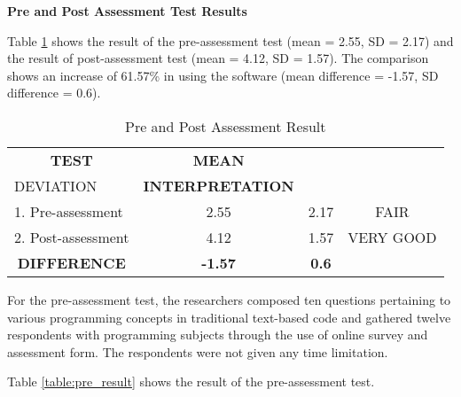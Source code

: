 \flushleft
\textbf{Pre and Post Assessment Test Results}
\justifying

\parx
Table \ref{table:pre_post} shows the result of the pre-assessment test
(mean = 2.55, SD = 2.17) and the result of post-assessment test
(mean = 4.12, SD = 1.57). The comparison shows an increase of 61.57\% in using
the software (mean difference = -1.57, SD difference = 0.6).

\begin{longtable}[c]{lccc}
\caption{Pre and Post Assessment Result}
\label{table:pre_post}\\ \hline
\multicolumn{1}{c}{\textbf{TEST}}       & \textbf{MEAN}  & \textbf{\begin{tabular}[c]{@{}c@{}}STANDARD\\ DEVIATION\end{tabular}} & \textbf{INTERPRETATION} \\ \hline
\endfirsthead
%
\endhead
%
1. Pre-assessment                       & 2.55           & 2.17                                                                  & FAIR                    \\
2. Post-assessment                      & 4.12           & 1.57                                                                  & VERY GOOD               \\
\multicolumn{1}{c}{\textbf{DIFFERENCE}} & \textbf{-1.57} & \textbf{0.6}                                                          & \textbf{}              \\ \hline
\end{longtable}

\parx
For the pre-assessment test, the researchers composed ten questions pertaining
to various programming concepts in traditional text-based code and gathered
twelve respondents with programming subjects through the use of online
survey and assessment form. The respondents were not given any time limitation.

\parx
Table \ref{table:pre_result} shows the result of the pre-assessment test.

